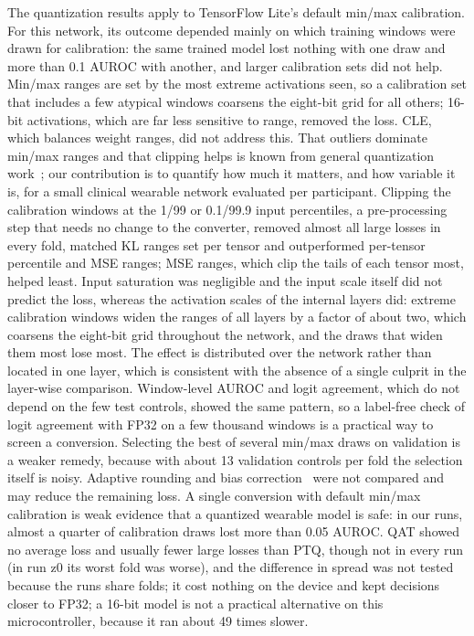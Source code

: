 \documentclass[preprint,12pt]{elsarticle}
\begin{document}
The quantization results apply to TensorFlow Lite's default min/max calibration. For this network, its outcome depended mainly on which training windows were drawn for calibration: the same trained model lost nothing with one draw and more than 0.1 AUROC with another, and larger calibration sets did not help. Min/max ranges are set by the most extreme activations seen, so a calibration set that includes a few atypical windows coarsens the eight-bit grid for all others; 16-bit activations, which are far less sensitive to range, removed the loss. CLE, which balances weight ranges, did not address this. That outliers dominate min/max ranges and that clipping helps is known from general quantization work~\cite{Wu2020,Banner2019ACIQ,Zhao2019OCS}; our contribution is to quantify how much it matters, and how variable it is, for a small clinical wearable network evaluated per participant. Clipping the calibration windows at the 1/99 or 0.1/99.9 input percentiles, a pre-processing step that needs no change to the converter, removed almost all large losses in every fold, matched KL ranges set per tensor and outperformed per-tensor percentile and MSE ranges; MSE ranges, which clip the tails of each tensor most, helped least. Input saturation was negligible and the input scale itself did not predict the loss, whereas the activation scales of the internal layers did: extreme calibration windows widen the ranges of all layers by a factor of about two, which coarsens the eight-bit grid throughout the network, and the draws that widen them most lose most. The effect is distributed over the network rather than located in one layer, which is consistent with the absence of a single culprit in the layer-wise comparison. Window-level AUROC and logit agreement, which do not depend on the few test controls, showed the same pattern, so a label-free check of logit agreement with FP32 on a few thousand windows is a practical way to screen a conversion. Selecting the best of several min/max draws on validation is a weaker remedy, because with about 13 validation controls per fold the selection itself is noisy. Adaptive rounding and bias correction~\cite{Nagel2020AdaRound,NagelDFQ2019} were not compared and may reduce the remaining loss. A single conversion with default min/max calibration is weak evidence that a quantized wearable model is safe: in our runs, almost a quarter of calibration draws lost more than 0.05 AUROC. QAT showed no average loss and usually fewer large losses than PTQ, though not in every run (in run z0 its worst fold was worse), and the difference in spread was not tested because the runs share folds; it cost nothing on the device and kept decisions closer to FP32; a 16-bit model is not a practical alternative on this microcontroller, because it ran about 49 times slower.
\end{document}
